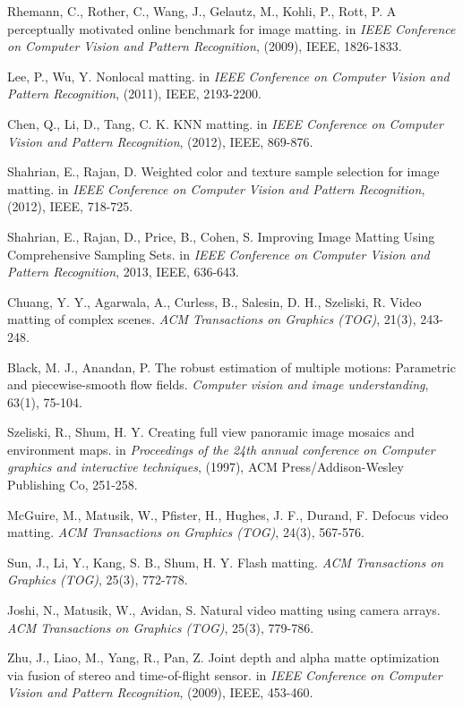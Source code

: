 \documentclass[a4paper,11pt]{report}
\begin{document}
\begin{thebibliography}{100}
 Rhemann, C., Rother, C., Wang, J., Gelautz, M., Kohli, P., Rott, P. A perceptually motivated online benchmark for image matting. in \textit{IEEE Conference on Computer Vision and Pattern Recognition}, (2009), IEEE, 1826-1833.

 Lee, P., Wu, Y. Nonlocal matting. in \textit{IEEE Conference on Computer Vision and Pattern Recognition}, (2011), IEEE, 2193-2200.

 Chen, Q., Li, D., Tang, C. K. KNN matting. in \textit{IEEE Conference on Computer Vision and Pattern Recognition}, (2012), IEEE, 869-876.

 Shahrian, E., Rajan, D. Weighted color and texture sample selection for image matting. in \textit{IEEE Conference on Computer Vision and Pattern Recognition}, (2012), IEEE, 718-725.

 Shahrian, E., Rajan, D., Price, B., Cohen, S. Improving Image Matting Using Comprehensive Sampling Sets. in \textit{IEEE Conference on Computer Vision and Pattern Recognition}, 2013, IEEE, 636-643.

 Chuang, Y. Y., Agarwala, A., Curless, B., Salesin, D. H., Szeliski, R. Video matting of complex scenes. \textit{ACM Transactions on Graphics (TOG)}, 21(3), 243-248.

 Black, M. J., Anandan, P. The robust estimation of multiple motions: Parametric and piecewise-smooth flow fields. \textit{Computer vision and image understanding}, 63(1), 75-104.

 Szeliski, R., Shum, H. Y. Creating full view panoramic image mosaics and environment maps. in \textit{Proceedings of the 24th annual conference on Computer graphics and interactive techniques}, (1997), ACM Press/Addison-Wesley Publishing Co, 251-258.

 McGuire, M., Matusik, W., Pfister, H., Hughes, J. F., Durand, F. Defocus video matting. \textit{ACM Transactions on Graphics (TOG)}, 24(3), 567-576.

 Sun, J., Li, Y., Kang, S. B., Shum, H. Y. Flash matting. \textit{ACM Transactions on Graphics (TOG)}, 25(3), 772-778.

 Joshi, N., Matusik, W., Avidan, S. Natural video matting using camera arrays. \textit{ACM Transactions on Graphics (TOG)}, 25(3), 779-786.

 Zhu, J., Liao, M., Yang, R., Pan, Z. Joint depth and alpha matte optimization via fusion of stereo and time-of-flight sensor. in \textit{IEEE Conference on Computer Vision and Pattern Recognition}, (2009), IEEE, 453-460.


\end{thebibliography}
\end{document}
